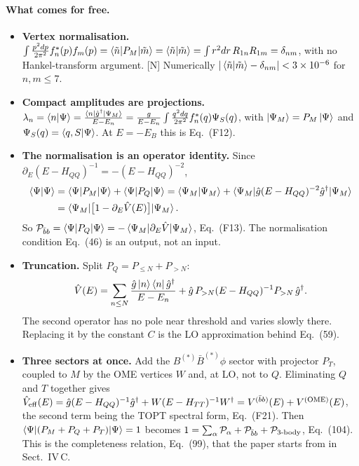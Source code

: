 \documentclass[11pt,a4paper]{article}
\newcommand{\tagN}{\textcolor{red!70!black}{\textsf{\small[N]}}}
\newcommand{\VQQ}{V^{(\bar bb)}}
\newcommand{\VOME}{V^{\rm (OME)}}
\newcommand{\Pbb}{{\cal P}_{\bar bb}}
\begin{document}
\paragraph{What comes for free.}
\begin{itemize}
\item \textbf{Vertex normalisation.} $\int\frac{p^2dp}{2\pi^2}f_n^*(p)f_m(p)=\braket{\tilde n|P_M|\tilde m}=\braket{\tilde n|\tilde m}=\int r^2dr\,R_{1n}R_{1m}=\delta_{nm}$, with no Hankel-transform argument. \tagN{} Numerically $|\braket{\tilde n|\tilde m}-\delta_{nm}|<3\times10^{-6}$ for $n,m\le7$.
\item \textbf{Compact amplitudes are projections.} $\lambda_n=\braket{n|\Psi}=\frac{\braket{n|\hat g^\dagger|\Psi_M}}{E-E_n}=\frac{g}{E-E_n}\int\frac{q^2dq}{2\pi^2}f_n^*(q)\Psi_S(q)$, with $\ket{\Psi_M}=P_M\ket\Psi$ and $\Psi_S(q)=\braket{q,S|\Psi}$. At $E=-E_B$ this is Eq.~(F12).
\item \textbf{The normalisation is an operator identity.} Since $\partial_E(E-H_{QQ})^{-1}=-(E-H_{QQ})^{-2}$,
\begin{align}
\braket{\Psi|\Psi}&=\braket{\Psi|P_M|\Psi}+\braket{\Psi|P_Q|\Psi}
=\braket{\Psi_M|\Psi_M}+\braket{\Psi_M|\hat g(E-H_{QQ})^{-2}\hat g^\dagger|\Psi_M}\nonumber\\
&=\braket{\Psi_M|\big[1-\partial_E\hat V(E)\big]|\Psi_M}.
\end{align}
So $\Pbb=\braket{\Psi|P_Q|\Psi}=-\braket{\Psi_M|\partial_E\hat V|\Psi_M}$, Eq.~(F13). The normalisation condition Eq.~(46) is an output, not an input.
\item \textbf{Truncation.} Split $P_Q=P_{\le N}+P_{>N}$:
\begin{equation}
\hat V(E)=\sum_{n\le N}\frac{\hat g\ket n\bra n\hat g^\dagger}{E-E_n}+\hat g\,P_{>N}(E-H_{QQ})^{-1}P_{>N}\,\hat g^\dagger .
\end{equation}
The second operator has no pole near threshold and varies slowly there. Replacing it by the constant $C$ is the LO approximation behind Eq.~(59).
\item \textbf{Three sectors at once.} Add the $B^{(*)}\bar B^{(*)}\phi$ sector with projector $P_T$, coupled to $M$ by the OME vertices $W$ and, at LO, not to $Q$. Eliminating $Q$ and $T$ together gives $\hat V_{\rm eff}(E)=\hat g(E-H_{QQ})^{-1}\hat g^\dagger+W(E-H_{TT})^{-1}W^\dagger=\VQQ(E)+\VOME(E)$, the second term being the TOPT spectral form, Eq.~(F21). Then $\braket{\Psi|(P_M+P_Q+P_T)|\Psi}=1$ becomes $1=\sum_\alpha{\cal P}_\alpha+\Pbb+{\cal P}_{3\text{-body}}$, Eq.~(104). This is the completeness relation, Eq.~(99), that the paper starts from in Sect.~IV\,C.
\end{itemize}
\end{document}
